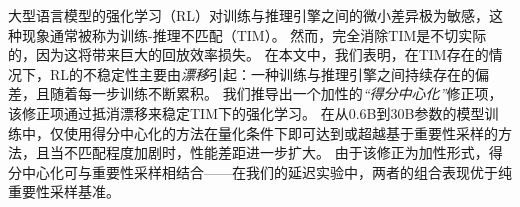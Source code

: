 大型语言模型的强化学习（RL）对训练与推理引擎之间的微小差异极为敏感，这种现象通常被称为训练-推理不匹配（TIM）。  
然而，完全消除TIM是不切实际的，因为这将带来巨大的回放效率损失。  
在本文中，我们表明，在TIM存在的情况下，RL的不稳定性主要由\textit{漂移}引起：一种训练与推理引擎之间持续存在的偏差，且随着每一步训练不断累积。  
我们推导出一个加性的\textit{“得分中心化”}修正项，该修正项通过抵消漂移来稳定TIM下的强化学习。  
在从0.6B到30B参数的模型训练中，仅使用得分中心化的方法在量化条件下即可达到或超越基于重要性采样的方法，且当不匹配程度加剧时，性能差距进一步扩大。  
由于该修正为加性形式，得分中心化可与重要性采样相结合——在我们的延迟实验中，两者的组合表现优于纯重要性采样基准。